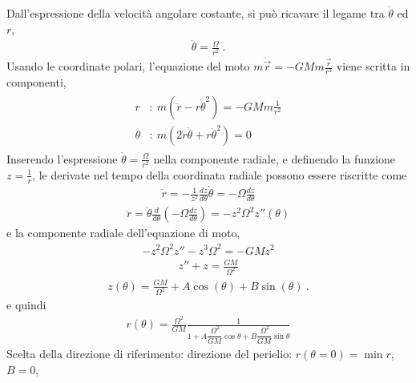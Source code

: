 \documentclass[letterpaper,10pt,italian]{jupyterBook}
\begin{document}
\sphinxAtStartPar
Dall’espressione della velocità angolare costante, si può ricavare il legame tra \(\dot{\theta}\) ed \(r\),
\begin{equation*}
\begin{split}\dot{\theta} = \frac{\Omega}{r^2} \ .\end{split}
\end{equation*}
\sphinxAtStartPar
Usando le coordinate polari, l’equazione del moto \(m \ddot{\vec{r}} = -G M m \frac{\vec{r}}{r^3}\) viene scritta in componenti,
\begin{equation*}
\begin{split}\begin{aligned}
r      & : \ m (\ddot{r} - r\dot{\theta}^2) = - G M m \frac{1}{r^2} \\
\theta & : \ m ( 2 \dot{r} \dot{\theta} + r \ddot{\theta}^2 ) = 0
\end{aligned}\end{split}
\end{equation*}
\sphinxAtStartPar
{}
Inserendo l’espressione \(\dot{\theta} = \frac{\Omega}{r^2}\) nella componente radiale, e definendo la funzione \(z = \frac{1}{r}\), le derivate nel tempo della coordinata radiale possono essere riscritte come
\begin{equation*}
\begin{split}\dot{r} = -\frac{1}{z^2}\frac{d z}{d \theta} \dot{\theta} = -\Omega \frac{dz}{d\theta} \end{split}
\end{equation*}\begin{equation*}
\begin{split}\ddot{r} = \dot{\theta} \frac{d}{d \theta} \left( - \Omega \frac{dz}{d \theta} \right) = - z^2 \Omega^2 z''(\theta)\end{split}
\end{equation*}
\sphinxAtStartPar
e la componente radiale dell’equazione di moto,
\begin{equation*}
\begin{split}-z^2 \Omega^2 z'' - z^3 \Omega^2 = - G M z^2\end{split}
\end{equation*}\begin{equation*}
\begin{split} z'' + z  = \frac{G M}{\Omega^2}\end{split}
\end{equation*}\begin{equation*}
\begin{split}z(\theta) = \frac{G M}{\Omega^2} + A \cos(\theta) + B \sin(\theta) \ .\end{split}
\end{equation*}
\sphinxAtStartPar
e quindi
\begin{equation*}
\begin{split}r(\theta) = \frac{\Omega^2}{G M}\frac{1}{1 + A \dfrac{\, \Omega^2}{GM} \cos \theta + B \dfrac{\, \Omega^2}{GM} \sin \theta}\end{split}
\end{equation*}
\sphinxAtStartPar
Scelta della direzione di riferimento: direzione del perielio: \(r(\theta=0) = \min r\), \(B = 0\),
\end{document}
